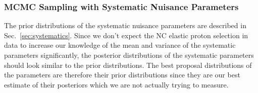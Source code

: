   \subsubsection{MCMC Sampling with Systematic Nuisance Parameters}\label{sec:mcmcsyst}
    The prior distributions of the systematic nuisance parameters are described
    in Sec.~\ref{sec:systematics}. Since we don't expect the NC elastic proton
    selection in data to increase our knowledge of the mean and variance of the
    systematic parameters significantly, the posterior distributions of the
    systematic parameters should look similar to the prior distributions. The
    best proposal distributions of the parameters are therefore their prior
    distributions since they are our best estimate of their posteriors which we
    are not actually trying to measure.

